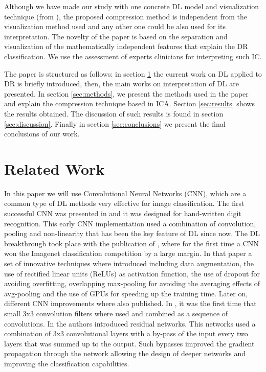 \documentclass[review]{elsarticle}
\theoremstyle{definition} %
\theoremstyle{remark}
\begin{document}
Although we have made our study with one concrete DL model and visualization technique (from \cite{de2017deep}), the proposed compression method is independent from the visualization method used and any other one could be also used for its interpretation. The novelty of the paper is based on the separation and visualization of the mathematically independent features that explain the DR classification. We use the assessment of experts clinicians for interpreting such IC.

The paper is structured as follows: in section \ref{sec:related} the current work on DL applied to DR is briefly introduced, then, the main works on interpretation of DL are presented. In section \ref{sec:methods}, we present the methods used in the paper and explain the compression technique based in ICA. Section \ref{sec:results} shows the results obtained. The discussion of such results is found in section \ref{sec:discussion}. Finally in section \ref{sec:conclusions} we present the final conclusions of our work.

\section{Related Work}\label{sec:related}

In this paper we will use Convolutional Neural Networks (CNN), which are a common type of DL methods very effective for image classification. The first successful CNN was presented in \cite{LeCun:98} and it was designed for hand-written digit recognition. This early CNN implementation used a combination of convolution, pooling and non-linearity that has been the key feature of DL since now. The DL breakthrough took place with the publication of \cite{NIPS2012_4824}, where for the first time a CNN won the Imagenet\cite{imagenet_cvpr09} classification competition by a large margin. In that paper a set of innovative techniques where introduced including data augmentation, the use of rectified linear units (ReLUs) as activation function, the use of dropout for avoiding overfitting, overlapping max-pooling for avoiding the averaging effects of avg-pooling and the use of GPUs for speeding up the training time. Later on, different CNN improvements where also published. In \cite{vggnet}, it was the first time that small 3x3 convolution filters where used and combined as a sequence of convolutions. In \cite{he2016deep} the authors introduced residual networks. This networks used a combination of 3x3 convolutional layers with a by-pass of the input every two layers that was summed up to the output. Such bypasses improved the gradient propagation through the network allowing the design of deeper networks and improving the classification capabilities. 
\end{document}
